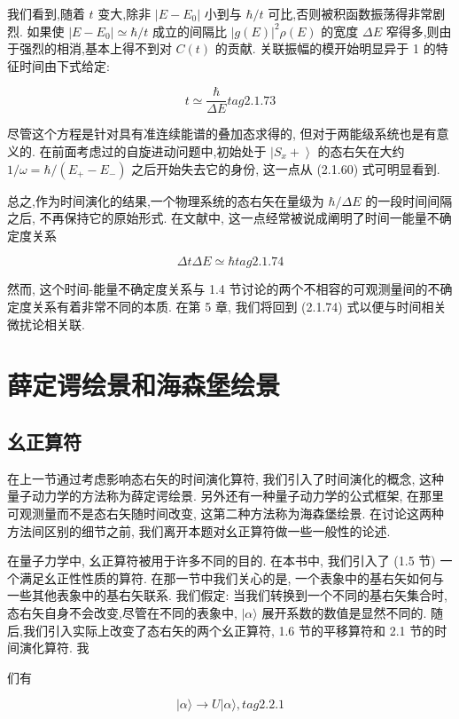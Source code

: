 \documentclass[lang=cn,newtx,10pt,scheme=chinese,thmcnt=section]{elegantbook}
\begin{document}
我们看到,随着 $t$ 变大,除非 $\left| {E - {E}_{0}}\right|$ 小到与 $\hbar /t$ 可比,否则被积函数振荡得非常剧烈. 如果使 $\left| {E - {E}_{0}}\right| \simeq \hbar /t$ 成立的间隔比 ${\left| g\left( E\right) \right| }^{2}\rho \left( E\right)$ 的宽度 ${\Delta E}$ 窄得多,则由于强烈的相消,基本上得不到对 $C\left( t\right)$ 的贡献. 关联振幅的模开始明显异于 1 的特征时间由下式给定:

$$
t \simeq \frac{\hbar }{\Delta E} tag{2.1.73}
$$

尽管这个方程是针对具有准连续能谱的叠加态求得的, 但对于两能级系统也是有意义的. 在前面考虑过的自旋进动问题中,初始处于 $\left| {{S}_{x} + }\right\rangle$ 的态右矢在大约 $1/\omega = \hbar /\left( {{E}_{ + } - {E}_{ - }}\right)$ 之后开始失去它的身份, 这一点从 (2.1.60) 式可明显看到.

总之,作为时间演化的结果,一个物理系统的态右矢在量级为 $\hbar /{\Delta E}$ 的一段时间间隔之后, 不再保持它的原始形式. 在文献中, 这一点经常被说成阐明了时间一能量不确定度关系

$$
{\Delta t\Delta E} \simeq \hbar tag{2.1.74}
$$

然而, 这个时间-能量不确定度关系与 1.4 节讨论的两个不相容的可观测量间的不确定度关系有着非常不同的本质. 在第 5 章, 我们将回到 (2.1.74) 式以便与时间相关微扰论相关联.

\section{薛定谔绘景和海森堡绘景}
\subsection*{幺正算符}

在上一节通过考虑影响态右矢的时间演化算符, 我们引入了时间演化的概念, 这种量子动力学的方法称为薛定谔绘景. 另外还有一种量子动力学的公式框架, 在那里可观测量而不是态右矢随时间改变, 这第二种方法称为海森堡绘景. 在讨论这两种方法间区别的细节之前, 我们离开本题对幺正算符做一些一般性的论述.

在量子力学中, 幺正算符被用于许多不同的目的. 在本书中, 我们引入了 (1.5 节) 一个满足幺正性性质的算符. 在那一节中我们关心的是, 一个表象中的基右矢如何与一些其他表象中的基右矢联系. 我们假定: 当我们转换到一个不同的基右矢集合时, 态右矢自身不会改变,尽管在不同的表象中, $|\alpha \rangle$ 展开系数的数值是显然不同的. 随后,我们引入实际上改变了态右矢的两个幺正算符, 1.6 节的平移算符和 2.1 节的时间演化算符. 我

们有

$$
\left| {\alpha \rangle \rightarrow U}\right| \alpha \rangle , tag{2.2.1}
$$
\end{document}
